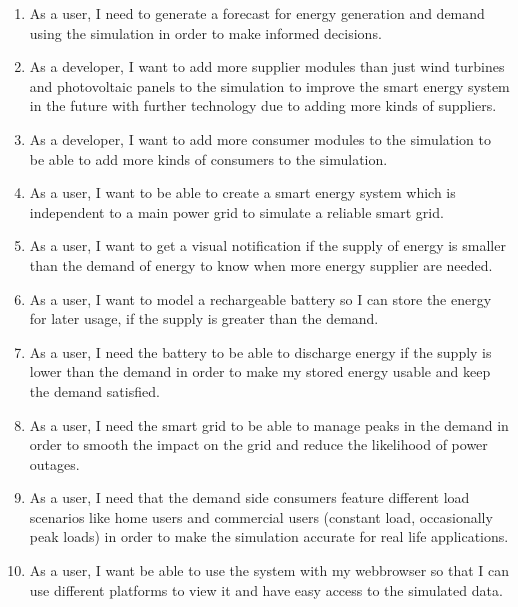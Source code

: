 \begin{enumerate}
\item As a user, I need to generate a forecast for energy generation and demand using the simulation in order to make informed decisions.

\item As a developer, I want to add more supplier modules than just wind turbines and photovoltaic panels to the simulation to improve the smart energy system in the future with further technology due to adding more kinds of suppliers. 

\item As a developer, I want to add more consumer modules to the simulation to be able to add more kinds of consumers to the simulation. 

\item As a user, I want to be able to create a smart energy system which is independent to a main power grid to simulate a reliable smart grid.

\item As a user, I want to get a visual notification if the supply of energy is smaller than the demand of energy to know when more energy supplier are needed.


\item As a user, I want to model a rechargeable battery so I can store the energy for later usage, if the supply is greater than the demand.

\item As a user, I need the battery to be able to discharge energy if the supply is lower than the demand in order to make my stored energy usable and keep the demand satisfied.

\item As a user, I need the smart grid to be able to manage peaks in the demand in order to smooth the impact on the grid and reduce the likelihood of power outages.

\item As a user, I need that the demand side consumers feature different load scenarios like home users and commercial users (constant load, occasionally peak loads) in order to make the simulation accurate for real life applications.

\item As a user, I want be able to use the system with my webbrowser so that I can use different platforms to view it and have easy access to the simulated data.


\end{enumerate}
